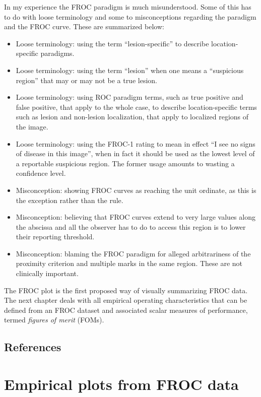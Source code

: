 \documentclass[
]{book}
\providecommand{\tightlist}{%
  \setlength{\itemsep}{0pt}\setlength{\parskip}{0pt}}
\begin{document}
In my experience the FROC paradigm is much misunderstood. Some of this has to do with loose terminology and some to misconceptions regarding the paradigm and the FROC curve. These are summarized below:

\begin{itemize}
\tightlist
\item
  Loose terminology: using the term ``lesion-specific'' to describe location-specific paradigms.
\item
  Loose terminology: using the term ``lesion'' when one means a ``suspicious region'' that may or may not be a true lesion.
\item
  Loose terminology: using ROC paradigm terms, such as true positive and false positive, that apply to the whole case, to describe location-specific terms such as lesion and non-lesion localization, that apply to localized regions of the image.
\item
  Loose terminology: using the FROC-1 rating to mean in effect ``I see no signs of disease in this image'', when in fact it should be used as the lowest level of a reportable suspicious region. The former usage amounts to wasting a confidence level.
\item
  Misconception: showing FROC curves as reaching the unit ordinate, as this is the exception rather than the rule.
\item
  Misconception: believing that FROC curves extend to very large values along the abscissa and all the observer has to do to access this region is to lower their reporting threshold.
\item
  Misconception: blaming the FROC paradigm for alleged arbitrariness of the proximity criterion and multiple marks in the same region. These are not clinically important.
\end{itemize}

The FROC plot is the first proposed way of visually summarizing FROC data. The next chapter deals with all empirical operating characteristics that can be defined from an FROC dataset and associated scalar measures of performance, termed \emph{figures of merit} (FOMs).

\hypertarget{froc-paradigm-references}{%
\section{References}\label{froc-paradigm-references}}

\hypertarget{empirical}{%
\chapter{Empirical plots from FROC data}\label{empirical}}
\end{document}
